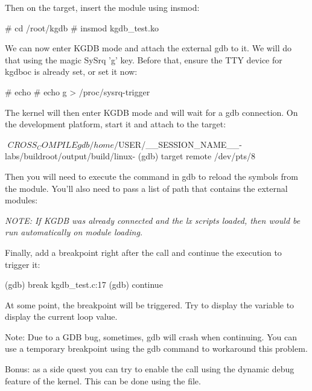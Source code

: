 Then on the target, insert the module using insmod:
\begin{bashinput}
# cd /root/kgdb
# insmod kgdb_test.ko
\end{bashinput}

We can now enter KGDB mode and attach the external gdb to it. We will do
that using the magic SySrq 'g' key. Before that, ensure the TTY
device for kgdboc is already set, or set it now:

\begin{bashinput}
# echo %
# echo g > /proc/sysrq-trigger
\end{bashinput}

The kernel will then enter KGDB mode and will wait for a gdb connection. On the
development platform, start it and attach to the target:

\begin{bashinput}$
$ ${CROSS_COMPILE}gdb /home/$USER/__SESSION_NAME__-labs/buildroot/output/build/linux-%
(gdb) target remote /dev/pts/8
\end{bashinput}

Then you will need to execute the  command in gdb to reload the
symbols from the module. You'll also need to pass a list of path that contains
the external modules:


{\em NOTE: If KGDB was already connected and the lx scripts loaded, then
 would be run automatically on module loading.}

Finally, add a breakpoint right after the  call and continue
the execution to trigger it:

\begin{bashinput}
(gdb) break kgdb_test.c:17
(gdb) continue
\end{bashinput}

At some point, the breakpoint will be triggered. Try to display the variable
 to display the current loop value.

Note: Due to a GDB bug, sometimes, gdb will crash when continuing. You can
use a temporary breakpoint using the gdb  command to workaround
this problem.

Bonus: as a side quest you can try to enable the  call using
the dynamic debug feature of the kernel. This can be done using the
 file.
